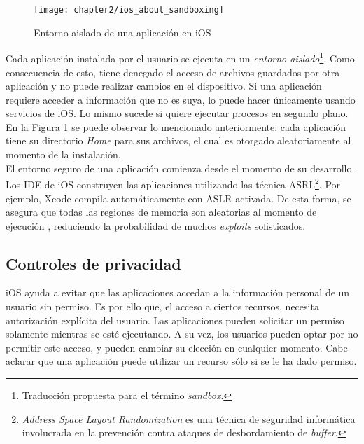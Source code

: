 \begin{figure}[hbtp]
	\centering
	\texttt{[image: chapter2/ios\_about\_sandboxing]}
    \caption{Entorno aislado de una aplicación en iOS \cite{iosdl}} 
    \label{fig:ch02:sandboxing}
\end{figure}
Cada aplicación instalada por el usuario se ejecuta en un \emph{entorno aislado}\footnote{Traducción propuesta para el término \textit{sandbox}.}. Como consecuencia de esto, tiene denegado el acceso de archivos guardados por otra aplicación y no puede realizar cambios en el dispositivo. Si una aplicación requiere acceder a información que no es suya, lo puede hacer únicamente usando servicios de iOS. Lo mismo sucede si quiere ejecutar procesos en segundo plano. En la Figura \ref{fig:ch02:sandboxing} se puede observar lo mencionado anteriormente: cada aplicación tiene su directorio \textit{Home} para sus archivos, el cual es otorgado aleatoriamente al momento de la instalación.\\

El entorno seguro de una aplicación comienza desde el momento de su desarrollo. Los IDE de iOS construyen las aplicaciones utilizando las técnica ASRL\footnote{\textit{Address Space Layout Randomization} es una técnica de seguridad informática involucrada en la prevención contra ataques de desbordamiento de \textit{buffer}.}. Por ejemplo, Xcode compila automáticamente con ASLR activada. De esta forma, se asegura que todas las regiones de memoria son aleatorias al momento de ejecución \cite{asg}, reduciendo la probabilidad de muchos \textit{exploits} sofisticados.
\subsection{Controles de privacidad}
iOS ayuda a evitar que las aplicaciones accedan a la información personal de un usuario sin permiso. Es por ello que, el acceso a ciertos recursos, necesita autorización explícita del usuario. Las aplicaciones pueden solicitar un permiso solamente mientras se esté ejecutando. A su vez, los usuarios pueden optar por no permitir este acceso, y pueden cambiar su elección en cualquier momento. Cabe aclarar que una aplicación puede utilizar un recurso sólo si se le ha dado permiso.\\

